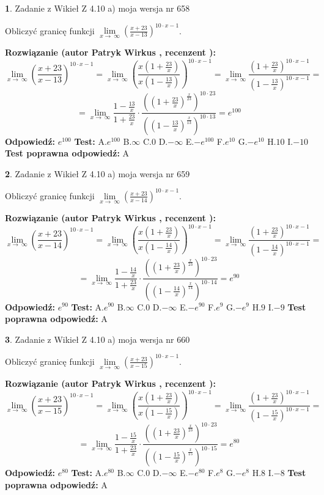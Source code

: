\documentclass[12pt, a4paper]{article}
\theoremstyle{definition} %
\newtheorem{zad}{}
\newcommand{\zadStart}[1]{\begin{zad}#1\newline}
\newcommand{\zadStop}{\end{zad}}
\newcommand{\rozwStart}[2]{\noindent \textbf{Rozwiązanie (autor #1 , recenzent #2): }\newline}
\newcommand{\rozwStop}{\newline}
\newcommand{\odpStart}{\noindent \textbf{Odpowiedź:}\newline}
\newcommand{\odpStop}{\newline}
\newcommand{\testStart}{\noindent \textbf{Test:}\newline}
\newcommand{\testStop}{\newline}
\newcommand{\kluczStart}{\noindent \textbf{Test poprawna odpowiedź:}\newline}
\newcommand{\kluczStop}{\newline}
\begin{document}
\zadStart{Zadanie z Wikieł Z 4.10 a) moja wersja nr 658}

Obliczyć granicę funkcji  $\lim\limits_{x\to\ \infty}(\frac{x+23}{x-13})^{10\cdot x-1}$.
\zadStop
\rozwStart{Patryk Wirkus}{}
$$\lim\limits_{x\to\ \infty}(\frac{x+23}{x-13})^{10\cdot x-1} = \lim\limits_{x\to\ \infty}(\frac{x(1+\frac{23}{x})}{x(1-\frac{13}{x})})^{10\cdot x-1}=\lim\limits_{x\to\ \infty}\frac{(1+\frac{23}{x})^{10\cdot x-1}}{(1-\frac{13}{x})^{10\cdot x-1}}=$$
$$=\lim\limits_{x\to\ \infty}\frac{1-\frac{13}{x}}{1+\frac{23}{x}}\cdot\frac{((1+\frac{23}{x})^{\frac{x}{23}})^{10\cdot23}}{((1-\frac{13}{x})^{\frac{x}{13}})^{10\cdot13}}=e^{100}$$
\rozwStop
\odpStart
$e^{100}$
\odpStop
\testStart
A.$e^{100}$ B.$\infty$ C.$0$ D.$-\infty$ E.$-e^{100}$
F.$e^{10}$ G.$-e^{10}$
H.$10$
I.$-10$
\testStop
\kluczStart
A
\kluczStop



\zadStart{Zadanie z Wikieł Z 4.10 a) moja wersja nr 659}

Obliczyć granicę funkcji  $\lim\limits_{x\to\ \infty}(\frac{x+23}{x-14})^{10\cdot x-1}$.
\zadStop
\rozwStart{Patryk Wirkus}{}
$$\lim\limits_{x\to\ \infty}(\frac{x+23}{x-14})^{10\cdot x-1} = \lim\limits_{x\to\ \infty}(\frac{x(1+\frac{23}{x})}{x(1-\frac{14}{x})})^{10\cdot x-1}=\lim\limits_{x\to\ \infty}\frac{(1+\frac{23}{x})^{10\cdot x-1}}{(1-\frac{14}{x})^{10\cdot x-1}}=$$
$$=\lim\limits_{x\to\ \infty}\frac{1-\frac{14}{x}}{1+\frac{23}{x}}\cdot\frac{((1+\frac{23}{x})^{\frac{x}{23}})^{10\cdot23}}{((1-\frac{14}{x})^{\frac{x}{14}})^{10\cdot14}}=e^{90}$$
\rozwStop
\odpStart
$e^{90}$
\odpStop
\testStart
A.$e^{90}$ B.$\infty$ C.$0$ D.$-\infty$ E.$-e^{90}$
F.$e^{9}$ G.$-e^{9}$
H.$9$
I.$-9$
\testStop
\kluczStart
A
\kluczStop



\zadStart{Zadanie z Wikieł Z 4.10 a) moja wersja nr 660}

Obliczyć granicę funkcji  $\lim\limits_{x\to\ \infty}(\frac{x+23}{x-15})^{10\cdot x-1}$.
\zadStop
\rozwStart{Patryk Wirkus}{}
$$\lim\limits_{x\to\ \infty}(\frac{x+23}{x-15})^{10\cdot x-1} = \lim\limits_{x\to\ \infty}(\frac{x(1+\frac{23}{x})}{x(1-\frac{15}{x})})^{10\cdot x-1}=\lim\limits_{x\to\ \infty}\frac{(1+\frac{23}{x})^{10\cdot x-1}}{(1-\frac{15}{x})^{10\cdot x-1}}=$$
$$=\lim\limits_{x\to\ \infty}\frac{1-\frac{15}{x}}{1+\frac{23}{x}}\cdot\frac{((1+\frac{23}{x})^{\frac{x}{23}})^{10\cdot23}}{((1-\frac{15}{x})^{\frac{x}{15}})^{10\cdot15}}=e^{80}$$
\rozwStop
\odpStart
$e^{80}$
\odpStop
\testStart
A.$e^{80}$ B.$\infty$ C.$0$ D.$-\infty$ E.$-e^{80}$
F.$e^{8}$ G.$-e^{8}$
H.$8$
I.$-8$
\testStop
\kluczStart
A
\kluczStop
\end{document}
